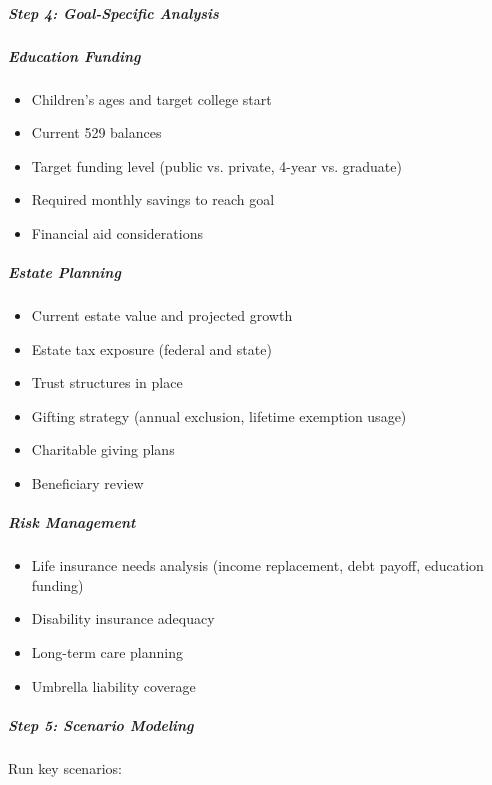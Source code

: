 \documentclass[11pt]{article}
\begin{document}
\subparagraph{Step 4: Goal-Specific Analysis}\mbox{}\par

\subparagraph{Education Funding}\mbox{}\par
\begin{itemize}[leftmargin=*,itemsep=2pt,topsep=2pt]
\item {} Children's ages and target college start
\item {} Current 529 balances
\item {} Target funding level (public vs. private, 4-year vs. graduate)
\item {} Required monthly savings to reach goal
\item {} Financial aid considerations
\end{itemize}

\subparagraph{Estate Planning}\mbox{}\par
\begin{itemize}[leftmargin=*,itemsep=2pt,topsep=2pt]
\item {} Current estate value and projected growth
\item {} Estate tax exposure (federal and state)
\item {} Trust structures in place
\item {} Gifting strategy (annual exclusion, lifetime exemption usage)
\item {} Charitable giving plans
\item {} Beneficiary review
\end{itemize}

\subparagraph{Risk Management}\mbox{}\par
\begin{itemize}[leftmargin=*,itemsep=2pt,topsep=2pt]
\item {} Life insurance needs analysis (income replacement, debt payoff, education funding)
\item {} Disability insurance adequacy
\item {} Long-term care planning
\item {} Umbrella liability coverage
\end{itemize}

\subparagraph{Step 5: Scenario Modeling}\mbox{}\par

Run key scenarios:
\end{document}
